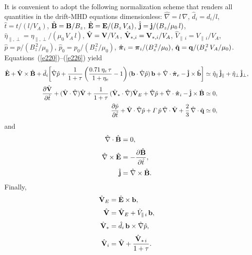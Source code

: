 \documentclass[notitlepage,12pt]{article}
\newcommand{\bpi}{\mbox{\boldmath$\pi$}}
\begin{document}
It is convenient to adopt the following normalization scheme that renders all quantities in the drift-MHD equations dimensionless: 
$\hat{\nabla} = l\,\nabla$, $\hat{d}_i=d_i/l$, $\hat{t} = t/(l/V_A)$, $\hat{\bf B} = {\bf B}/B_z$, $\hat{\bf E} = {\bf E}/(B_z\,V_A)$,
$\hat{\bf j} = {\bf j}/(B_z/\mu_0\,l)$, $\hat{\eta}_{\parallel,\perp} = \eta_{\parallel,\perp}/(\mu_0\,V_A\,l)$, $\hat{\bf V} = {\bf V}/V_A$,
$\hat{{\bf V}}_{\ast,i}= {\bf V}_{\ast,i}/V_A$, $\hat{V}_{\parallel\,i}= V_{\parallel\,i}/V_A$, $\hat{p} = p/(B_z^{\,2}/\mu_0)$, $\hat{p}_0 = p_0/(B_z^{\,2}/\mu_0)$, $\hat{\bpi}_{i} = \bpi_{i}/(B_z^{\,2}/\mu_0)$,
$\hat{\bf q} = {\bf q} /(B_z^{\,2}\,V_A/\mu_0)$. Equations~(\ref{e220})--(\ref{e226}) yield
\begin{align}\label{e227}
\hat{\bf E} + \hat{\bf V}\times \hat{\bf B} + \hat{d}_i\!\left[\hat{\nabla} \hat{p} + \frac{1}{1+\tau}\left(\frac{0.71\,\eta_e\,\tau}{1+\eta_e}-1\right)({\bf b}\cdot\hat{\nabla} \hat{p})\,{\bf b} + \hat{\nabla}\cdot\hat{\bpi}_e-\hat{\bf j}\times\hat{\bf b}\right] &\simeq \hat{\eta}_\parallel\,\hat{\bf j}_\parallel+ \hat{\eta}_\perp\,\hat{\bf j}_\perp,\\[0.5ex]
\frac{\partial \hat{\bf V}}{\partial \hat{t}} 
+ (\hat{\bf V}\cdot\hat{\nabla} )\hat{\bf V} + 
\frac{1}{1+\tau}\,(\hat{\bf V}_\ast\cdot\hat{\nabla})\hat{\bf V}_E
+ \hat{\nabla} \hat{p} + \hat{\nabla}\cdot\hat{\bpi}_i -
 \hat{\bf j}\times \hat{\bf B} &\simeq 0,
 \\[0.5ex]
\frac{\partial \hat{p}}{\partial \hat{t}} + \hat{\bf V}\cdot\hat{\nabla} \hat{p} + {\mit\Gamma}\,\hat{p}\,\hat{\nabla}\cdot\hat{\bf V} + \frac{2}{3}\,\hat{\nabla}\cdot \hat{\bf q}&\simeq 0,\label{e229}
\end{align}
and
\begin{align}
\hat{\nabla}\cdot\hat{\bf B} &= 0,\label{e230}\\[0.5ex]
\hat{\nabla}\times \hat{\bf E} &= - \frac{\partial \hat{\bf B}}{\partial \hat{t}},\label{e231}\\[0.5ex]
\hat{\bf j} &= \hat{\nabla} \times \hat{\bf B}.\label{e232}
\end{align}
Finally,
\begin{align}
\hat{\bf V}_E &= \hat{\bf E}\times {\bf b},\\[0.5ex]
\hat{\bf V} &= \hat{\bf V}_E + \hat{V}_{\parallel\,i}\,{\bf b},\\[0.5ex]
\hat{\bf V}_\ast &= \hat{d}_i\,{\bf b}\times \hat{\nabla} \hat{p},\\[0.5ex]
\hat{\bf V}_i &= \hat{\bf V} + \frac{\hat{\bf V}_{\ast\,i}}{1+\tau}.
\end{align}
\end{document}
